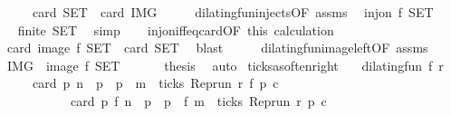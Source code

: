\begin{isabellebody}
\ \ \ \ {\isacharparenleft}\ {\isacartoucheopen}card\ {\isacharquery}SET\ {\isacharequal}\ card\ {\isacharquery}IMG{\isacartoucheclose}{\isacharparenright}\isanewline
%
\isadelimproof
%
\endisadelimproof
%
\isatagproof
{}\isamarkupfalse%
\ {\isacharminus}\isanewline
\ \ \isamarkupfalse%
\ dilating{\isacharunderscore}fun{\isacharunderscore}injects{\isacharbrackleft}OF\ assms{\isacharbrackright}\ \isamarkupfalse%
\ {\isacartoucheopen}inj{\isacharunderscore}on\ f\ {\isacharquery}SET{\isacartoucheclose}\ \isacommand{{\isachardot}}\isamarkupfalse%
\isanewline
\ \ \isamarkupfalse%
\ \isamarkupfalse%
\ {\isacartoucheopen}finite\ {\isacharquery}SET{\isacartoucheclose}\ \isamarkupfalse%
\ simp\isanewline
\ \ \isamarkupfalse%
\ inj{\isacharunderscore}on{\isacharunderscore}iff{\isacharunderscore}eq{\isacharunderscore}card{\isacharbrackleft}OF\ this{\isacharbrackright}\ calculation\isanewline
\ \ \ \ \isamarkupfalse%
\ {\isacartoucheopen}card\ {\isacharparenleft}image\ f\ {\isacharquery}SET{\isacharparenright}\ {\isacharequal}\ card\ {\isacharquery}SET{\isacartoucheclose}\ \isamarkupfalse%
\ blast\isanewline
\ \ \isamarkupfalse%
\ \isamarkupfalse%
\ dilating{\isacharunderscore}fun{\isacharunderscore}image{\isacharunderscore}left{\isacharbrackleft}OF\ assms{\isacharbrackright}\ \isamarkupfalse%
\ {\isacartoucheopen}{\isacharquery}IMG\ {\isacharequal}\ image\ f\ {\isacharquery}SET{\isacartoucheclose}\ \isacommand{{\isachardot}}\isamarkupfalse%
\isanewline
\ \ \isamarkupfalse%
\ \isamarkupfalse%
\ {\isacharquery}thesis\ \isamarkupfalse%
\ auto\isanewline
{}\isamarkupfalse%
%
\endisatagproof
{\isafoldproof}%
%
\isadelimproof
\isanewline
%
\endisadelimproof
\isanewline
{}\isamarkupfalse%
\ ticks{\isacharunderscore}as{\isacharunderscore}often{\isacharunderscore}right{\isacharcolon}\isanewline
\ \ \ {\isacartoucheopen}dilating{\isacharunderscore}fun\ f\ r{\isacartoucheclose}\isanewline
\ \ \ \ \ {\isacartoucheopen}card\ {\isacharbraceleft}p{\isachardot}\ n\ {\isacharless}\ p\ {\isasymand}\ p\ {\isasymle}\ m\ {\isasymand}\ ticks\ {\isacharparenleft}{\isacharparenleft}Rep{\isacharunderscore}run\ r{\isacharparenright}\ {\isacharparenleft}f\ p{\isacharparenright}\ c{\isacharparenright}{\isacharbraceright}\isanewline
\ \ \ \ \ \ \ \ \ \ {\isacharequal}\ card\ {\isacharbraceleft}p{\isachardot}\ f\ n\ {\isacharless}\ p\ {\isasymand}\ p\ {\isasymle}\ f\ m\ {\isasymand}\ ticks\ {\isacharparenleft}{\isacharparenleft}Rep{\isacharunderscore}run\ r{\isacharparenright}\ p\ c{\isacharparenright}{\isacharbraceright}{\isacartoucheclose}\isanewline

\end{isabellebody}

